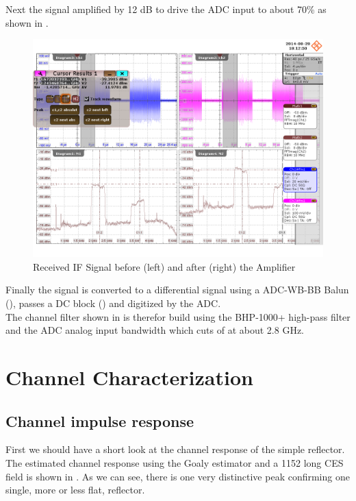 Next the signal amplified by 12 dB to drive the \gls{ADC} input to about 70\%
as shown in . \\

\begin{figure}[p]
  \centering
  \includegraphics[width=\textwidth]{figures/osci/res_450_rx_amp}
  \caption{Received \gls{IF} Signal before (left) and after (right) the Amplifier}
  \label{fig:res_450_rx_amp}
\end{figure}

Finally the signal is converted to a differential signal using a ADC-WB-BB Balun
(), passes a \gls{DC} block ()
and digitized by the \gls{ADC}. \\

The channel filter shown in  is therefor build using
the BHP-1000+ high-pass filter and the \gls{ADC} analog input bandwidth which
cuts of at about 2.8 GHz. \\

\section{Channel Characterization}
\subsection{Channel impulse response}
\label{sec:res_450_h}
First we should have a short look at the channel response of the simple
reflector. The estimated channel response using the Goaly estimator and a
1152 long \gls{CES} field is shown in .
As we can see, there is one very distinctive peak confirming one single,
more or less flat, reflector. \\

